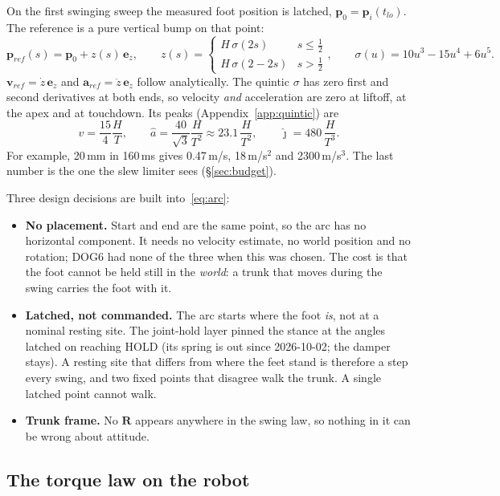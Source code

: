 \documentclass[11pt,a4paper]{article}
\newcommand{\vp}{\mathbf{p}}
\newcommand{\vv}{\mathbf{v}}
\newcommand{\va}{\mathbf{a}}
\newcommand{\ez}{\mathbf{e}_z}
\begin{document}
On the first swinging sweep the measured foot position is latched,
$\vp_0 = \vp_i(t_{lo})$. The reference is a pure vertical bump on that point:
\begin{equation}
\vp_{ref}(s) = \vp_0 + z(s)\,\ez, \qquad
z(s) = \begin{cases} H\,\sigma(2s) & s \le \tfrac12 \\[2pt]
                     H\,\sigma(2-2s) & s > \tfrac12 \end{cases},
\qquad \sigma(u) = 10u^3 - 15u^4 + 6u^5 .
\label{eq:arc}
\end{equation}
$\vv_{ref} = \dot z\,\ez$ and $\va_{ref} = \ddot z\,\ez$ follow analytically.
The quintic $\sigma$ has zero first and second derivatives at both ends, so
velocity \emph{and} acceleration are zero at liftoff, at the apex and at
touchdown. Its peaks (Appendix~\ref{app:quintic}) are
\begin{equation}
\hat v = \frac{15}{4}\frac{H}{T}, \qquad
\hat a = \frac{40}{\sqrt3}\frac{H}{T^2} \approx 23.1\,\frac{H}{T^2}, \qquad
\hat{\jmath} = 480\,\frac{H}{T^3}.
\label{eq:peaks}
\end{equation}
For example, 20\,mm in 160\,ms gives 0.47\,m/s, 18\,m/s$^2$ and
2300\,m/s$^3$. The last number is the one the slew limiter sees
(\S\ref{sec:budget}).

Three design decisions are built into~\eqref{eq:arc}:
\begin{itemize}[leftmargin=1.3em]
\item \textbf{No placement.} Start and end are the same point, so the arc has
no horizontal component. It needs no velocity estimate, no world position and
no rotation; DOG6 had none of the three when this was chosen. The cost is
that the foot cannot be held still in the \emph{world}: a trunk that moves
during the swing carries the foot with it.
\item \textbf{Latched, not commanded.} The arc starts where the foot
\emph{is}, not at a nominal resting site. The joint-hold layer pinned the
stance at the angles latched on reaching HOLD (its spring is out since
2026-10-02; the damper stays). A resting site that differs
from where the feet stand is therefore a step every swing, and two fixed
points that disagree walk the trunk. A single latched point cannot walk.
\item \textbf{Trunk frame.} No $\mathbf{R}$ appears anywhere in the swing
law, so nothing in it can be wrong about attitude.
\end{itemize}

\subsection{The torque law on the robot}
\end{document}
